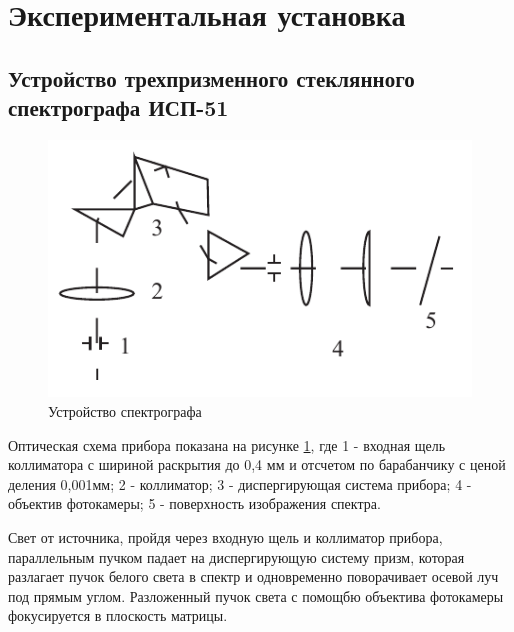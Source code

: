 \documentclass[a4paper, 12pt]{article}
\begin{document}
\section{Экспериментальная установка}
\subsection{Устройство трехпризменного стеклянного спектрографа ИСП-51}
\begin{figure}[!htb]
\centering
\includegraphics[scale=1]{scheme.pdf}
\caption{Устройство спектрографа}
\label{fig:scheme}
\end{figure}
Оптическая схема прибора показана на рисунке \ref{fig:scheme}, где 1 - входная щель коллиматора с шириной раскрытия до 0,4 мм и отсчетом по барабанчику с ценой деления 0,001мм; 2 - коллиматор; 3 - диспергирующая система прибора; 4 - объектив фотокамеры; 5 - поверхность изображения спектра.

Свет от источника, пройдя через входную щель и коллиматор прибора, параллельным пучком падает на диспергирующую систему призм, которая разлагает пучок белого света в спектр и одновременно поворачивает осевой луч под прямым углом. Разложенный пучок света с помощбю объектива фотокамеры фокусируется в плоскость матрицы.
\end{document}
